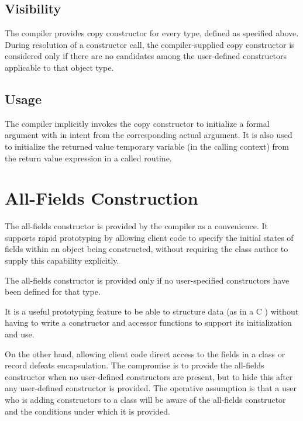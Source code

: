 \subsection{Visibility}

The compiler provides copy constructor for every type, defined as specified
above.  During resolution of a constructor call, the compiler-supplied copy
constructor is considered only if there are no candidates among the user-defined
constructors applicable to that object type.

\subsection{Usage}

The compiler implicitly invokes the copy constructor to initialize a formal
argument with in intent from the corresponding actual argument.  It is also used
to initialize the returned value temporary variable (in the calling context)
from the return value expression in a called routine.



\section{All-Fields Construction}

The all-fields constructor is provided by the compiler as a convenience.  It
supports rapid prototyping by allowing client code to specify the initial states
of fields within an object being constructed, without requiring the class author
to supply this capability explicitly.

The all-fields constructor is provided only if no user-specified constructors
have been defined for that type.  

\begin{rationale}

It is a useful prototyping feature to be able to structure data (as in a C
) without having to write a constructor and accessor functions to
support its initialization and use.

On the other hand, allowing client code direct access to the fields in a class
or record defeats encapsulation.  The compromise is to provide the all-fields
constructor when no user-defined constructors are present, but to hide this
after any user-defined constructor is provided.  The operative assumption is
that a user who is adding constructors to a class will be aware of the
all-fields constructor and the conditions under which it is provided.

\end{rationale}

